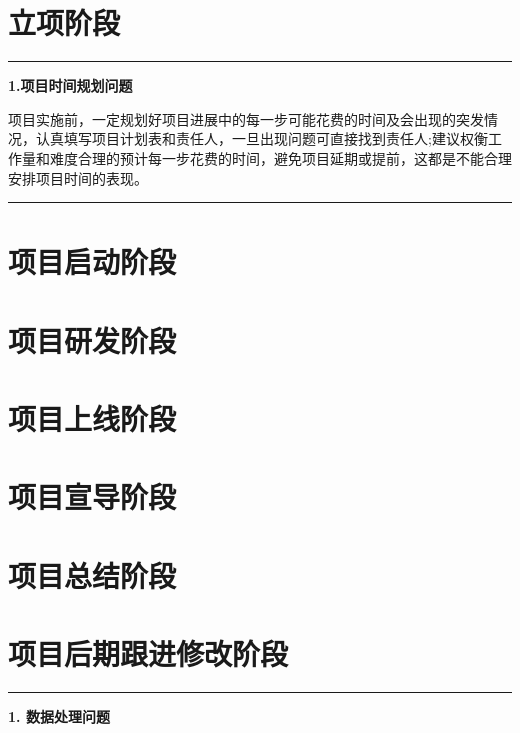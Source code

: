 \documentclass[]{book}
\begin{document}
\chapter{立项阶段}\label{project}

\begin{center}\rule{0.5\linewidth}{\linethickness}\end{center}

\textbf{1.项目时间规划问题}

项目实施前，一定规划好项目进展中的每一步可能花费的时间及会出现的突发情况，认真填写项目计划表和责任人，一旦出现问题可直接找到责任人;建议权衡工作量和难度合理的预计每一步花费的时间，避免项目延期或提前，这都是不能合理安排项目时间的表现。

\begin{center}\rule{0.5\linewidth}{\linethickness}\end{center}

\chapter{项目启动阶段}\label{start}

\chapter{项目研发阶段}\label{model}

\chapter{项目上线阶段}\label{ux90e8ux7f72}

\chapter{项目宣导阶段}\label{ux5ba3ux5bfc}

\chapter{项目总结阶段}\label{ux603bux7ed3}

\chapter{项目后期跟进修改阶段}\label{ux8ddfux8e2a}

\begin{center}\rule{0.5\linewidth}{\linethickness}\end{center}

\textbf{1. 数据处理问题}
\end{document}
